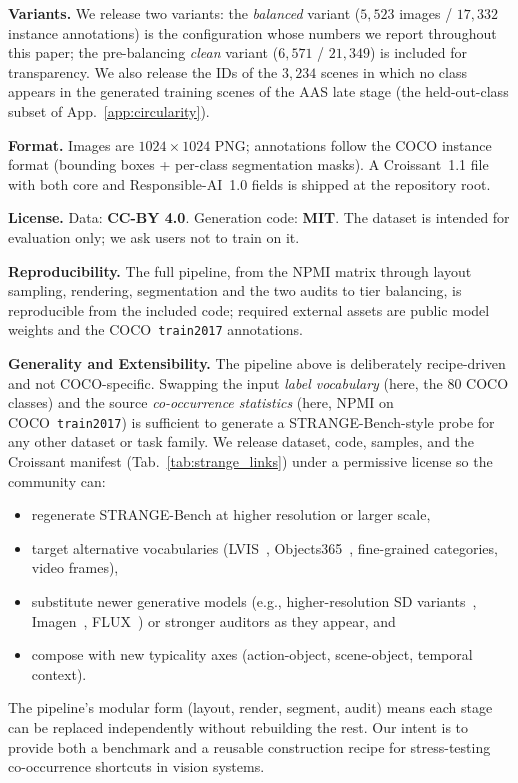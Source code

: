 \noindent\textbf{Variants.}
We release two variants: the \emph{balanced} variant ($5{,}523$ images / $17{,}332$ instance annotations) is the configuration whose numbers we report throughout this paper; the pre-balancing \emph{clean} variant ($6{,}571$ / $21{,}349$) is included for transparency. We also release the IDs of the $3{,}234$ scenes in which no class appears in the generated training scenes of the AAS late stage (the held-out-class subset of App.~\ref{app:circularity}).

\noindent\textbf{Format.}
Images are $1024 \times 1024$ PNG; annotations follow the COCO instance format (bounding boxes + per-class segmentation masks).
A Croissant~1.1 file with both core and Responsible-AI~1.0 fields is shipped at the repository root.

\noindent\textbf{License.}
Data: \textbf{CC-BY 4.0}. Generation code: \textbf{MIT}. The dataset is intended for evaluation only; we ask users not to train on it.

\noindent\textbf{Reproducibility.}
The full pipeline, from the NPMI matrix through layout sampling, rendering, segmentation and the two audits to tier balancing, is reproducible from the included code; required external assets are public model weights and the COCO~\texttt{train2017} annotations.

\noindent\textbf{Generality and Extensibility.}
The pipeline above is deliberately recipe-driven and not COCO-specific. Swapping the input \emph{label vocabulary} (here, the $80$ COCO classes) and the source \emph{co-occurrence statistics} (here, NPMI on COCO~\texttt{train2017}) is sufficient to generate a STRANGE-Bench-style probe for any other dataset or task family. We release dataset, code, samples, and the Croissant manifest (Tab.~\ref{tab:strange_links}) under a permissive license so the community can:
\begin{itemize}

 \item regenerate STRANGE-Bench at higher resolution or larger scale, 
 \item target alternative vocabularies (LVIS~\cite{gupta2019lvis}, Objects365~\cite{shao2019objects365}, fine-grained categories, video frames), 
 \item substitute newer generative models (e.g., higher-resolution SD variants~\cite{stabilityai2024sd35}, Imagen~\cite{saharia2022photorealistic}, FLUX~\cite{flux2024}) or stronger auditors as they appear, and 
 \item compose with new typicality axes (action-object, scene-object, temporal context).
\end{itemize}
The pipeline's modular form (layout, render, segment, audit) means each stage can be replaced independently without rebuilding the rest. Our intent is to provide both a benchmark and a reusable construction recipe for stress-testing co-occurrence shortcuts in vision systems. 


